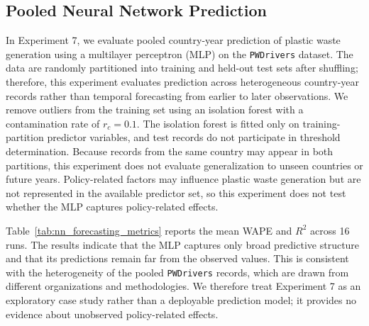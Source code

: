 \subsection{Pooled Neural Network Prediction}


In Experiment 7, we evaluate pooled country-year prediction of plastic waste generation using a multilayer perceptron (MLP) on the \texttt{PWDrivers} dataset. The data are randomly partitioned into training and held-out test sets after shuffling; therefore, this experiment evaluates prediction across heterogeneous country-year records rather than temporal forecasting from earlier to later observations. We remove outliers from the training set using an isolation forest with a contamination rate of \(r_c = 0.1\). The isolation forest is fitted only on training-partition predictor variables, and test records do not participate in threshold determination. Because records from the same country may appear in both partitions, this experiment does not evaluate generalization to unseen countries or future years. Policy-related factors may influence plastic waste generation but are not represented in the available predictor set, so this experiment does not test whether the MLP captures policy-related effects.



Table~\ref{tab:nn_forecasting_metrics} reports the mean WAPE and \(R^2\) across 16 runs. The results indicate that the MLP captures only broad predictive structure and that its predictions remain far from the observed values. This is consistent with the heterogeneity of the pooled \texttt{PWDrivers} records, which are drawn from different organizations and methodologies. We therefore treat Experiment 7 as an exploratory case study rather than a deployable prediction model; it provides no evidence about unobserved policy-related effects.

